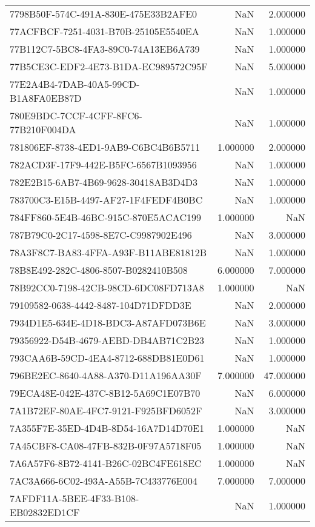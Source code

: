 \begin{tabular}{lrr}
7798B50F-574C-491A-830E-475E33B2AFE0 & NaN & 2.000000 \\
77ACFBCF-7251-4031-B70B-25105E5540EA & NaN & 1.000000 \\
77B112C7-5BC8-4FA3-89C0-74A13EB6A739 & NaN & 1.000000 \\
77B5CE3C-EDF2-4E73-B1DA-EC989572C95F & NaN & 5.000000 \\
77E2A4B4-7DAB-40A5-99CD-B1A8FA0EB87D & NaN & 1.000000 \\
780E9BDC-7CCF-4CFF-8FC6-77B210F004DA & NaN & 1.000000 \\
781806EF-8738-4ED1-9AB9-C6BC4B6B5711 & 1.000000 & 2.000000 \\
782ACD3F-17F9-442E-B5FC-6567B1093956 & NaN & 1.000000 \\
782E2B15-6AB7-4B69-9628-30418AB3D4D3 & NaN & 1.000000 \\
783700C3-E15B-4497-AF27-1F4FEDF4B0BC & NaN & 1.000000 \\
784FF860-5E4B-46BC-915C-870E5ACAC199 & 1.000000 & NaN \\
787B79C0-2C17-4598-8E7C-C9987902E496 & NaN & 3.000000 \\
78A3F8C7-BA83-4FFA-A93F-B11ABE81812B & NaN & 1.000000 \\
78B8E492-282C-4806-8507-B0282410B508 & 6.000000 & 7.000000 \\
78B92CC0-7198-42CB-98CD-6DC08FD713A8 & 1.000000 & NaN \\
79109582-0638-4442-8487-104D71DFDD3E & NaN & 2.000000 \\
7934D1E5-634E-4D18-BDC3-A87AFD073B6E & NaN & 3.000000 \\
79356922-D54B-4679-AEBD-DB4AB71C2B23 & NaN & 1.000000 \\
793CAA6B-59CD-4EA4-8712-688DB81E0D61 & NaN & 1.000000 \\
796BE2EC-8640-4A88-A370-D11A196AA30F & 7.000000 & 47.000000 \\
79ECA48E-042E-437C-8B12-5A69C1E07B70 & NaN & 6.000000 \\
7A1B72EF-80AE-4FC7-9121-F925BFD6052F & NaN & 3.000000 \\
7A355F7E-35ED-4D4B-8D54-16A7D14D70E1 & 1.000000 & NaN \\
7A45CBF8-CA08-47FB-832B-0F97A5718F05 & 1.000000 & NaN \\
7A6A57F6-8B72-4141-B26C-02BC4FE618EC & 1.000000 & NaN \\
7AC3A666-6C02-493A-A55B-7C433776E004 & 7.000000 & 7.000000 \\
7AFDF11A-5BEE-4F33-B108-EB02832ED1CF & NaN & 1.000000 \\

\end{tabular}
